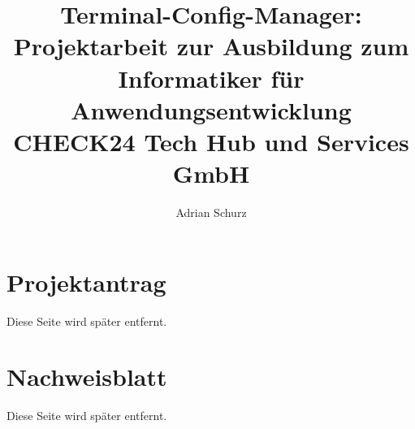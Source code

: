 \documentclass[a4paper,11pt,draft=false,bibliography=totoc]{scrartcl} %
\author{Adrian Schurz}
\title{Terminal-Config-Manager:\\
	Projektarbeit zur Ausbildung zum Informatiker für Anwendungsentwicklung\\
	CHECK24 Tech Hub und Services GmbH\\
	}
\begin{document}

\titlehead{\centering\texttt{[image: header.png]}}
\maketitle
{}
\newpage

\section{Projektantrag}
\begin{center}
	Diese Seite wird später entfernt.
\end{center}


\section{Nachweisblatt}
\begin{center}
	Diese Seite wird später entfernt.
\end{center}


\newpage
\tableofcontents
\newpage
















\printbibliography

\printglossaries
\end{document}
